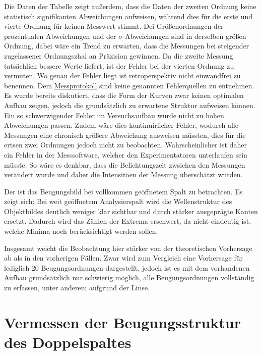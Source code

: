 Die Daten der Tabelle  zeigt außerdem, dass die Daten der zweiten Ordnung keine statistisch signifikanten Abweichungen aufweisen, während dies für die erste und vierte Ordnung für keinen Messwert stimmt. Dei Größenordnungen der prozentualen Abweichungen und der $\sigma$-Abweichungen sind in derselben größen Ordnung, dabei wäre ein Trend zu erwarten, dass die Messungen bei steigender zugelassener Ordnungszhal an Präzision gewinnen. Da die zweite Messung tatsächlich bessere Werte liefert, ist der Fehler bei der vierten Ordnung zu vermuten. Wo genau der Fehler liegt ist retroperspektiv nicht einwandfrei zu benennen. Dem \hyperref[ch:Protokoll]{Messprotokoll} sind keine genannten Fehlerquellen zu entnehmen. 
Es wurde bereits diskutiert, dass die Form der Kurven zwar keinen optimalen Aufbau zeigen, jedoch die grundsätzlich zu erwartene Struktur aufweisen können. Ein so schwerwigender Fehler im Versuchsaufbau würde nicht zu hohen Abweichungen passen. Zudem wäre dies kontinuirlicher Fehler, wodurch alle Messungen eine chronisch größere Abweichung ausweisen müssten, dies für die ertsen zwei Ordnungen jedoch nicht zu beobachten. Wahrscheinlicher ist daher ein Fehler in der Messsoftware, welcher den Experimentatoren unterlaufen sein müsste. So wäre es denkbar, dass die Belichtungszeit zwsichen den Messungen verändert wurde und daher die Intensitöen der Messung überschätzt wurden. 

Der  ist das Beugungsbild bei vollkommen geöffnetem Spalt zu betrachten. Es zeigt sich: Bei weit geöffnetem Analysierspalt wird die Wellenstruktur des Objektbildes deutlich weniger klar sichtbar und durch stärker ausgeprägte Kanten ersetzt. Dadurch wird das Zählen der Extrema erschwert, da nicht eindeutig ist, welche Minima noch berücksichtigt werden sollen.


Insgesamt weicht die Beobachtung hier stärker von der theoretischen Vorhersage ab als in den vorherigen Fällen. Zwar wird zum Vergleich eine Vorhersage für lediglich 20 Beugungsordnungen dargestellt, jedoch ist es mit dem vorhandenen Aufbau grundsätzlich nur schwierig möglich, alle Beugungsordnungen vollständig zu erfassen, unter anderem aufgrund der Linse.

\section{Vermessen der Beugungsstruktur des Doppelspaltes}
\label{sec:A3}

